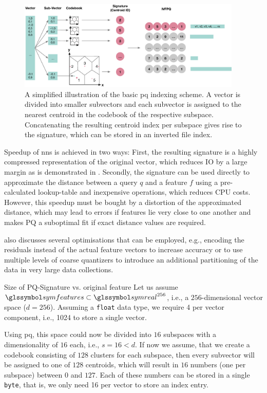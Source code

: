 \begin{figure}[tb]
    \centering
    \includegraphics[width=0.95\textwidth]{figures/pq}
    \caption{A simplified illustration of the basic \acrshort{pq} indexing scheme. A vector is divided into smaller subvectors and each subvector is assigned to the nearest centroid in the codebook of the respective subspace. Concatenating the resulting centroid index per subspace gives rise to the signature, which can be stored in an inverted file index.}
    \label{fig:pq}
\end{figure}

Speedup of \acrshort{nns} is achieved in two ways: First, the resulting signature is a highly compressed representation of the original vector, which reduces IO by a large margin as is demonstrated in . Secondly, the signature can be used directly to approximate the distance between a query $q$ and a feature $f$ using a pre-calculated lookup-table and inexpensive operations, which reduces CPU costs. However, this speedup must be bought by a distortion of the approximated distance, which may lead to errors if features lie very close to one another and makes PQ a suboptimal fit if exact distance values are required.

\cite{Jegou:2010Product} also discusses several optimisations that can be employed, e.g., encoding the residuals instead of the actual feature vectors to increase accuracy or to use multiple levels of coarse quantizers to introduce an additional partitioning of the data in very large data collections.

\begin{example}[label=example:pq_compression]{Size of PQ-Signature vs. original feature}{}
    Let us assume $\symfeatures \subset \symreal^{256}$, i.e., a $256$-dimensional vector space ($d = 256$). Assuming a \texttt{float} data type, we require \SI{4}{\byte} per vector component, i.e., \SI{1024}{\byte} to store a single vector.
    
    Using \acrshort{pq}, this space could now be divided into $16$ subspaces with a dimensionality of $16$ each, i.e., $s = 16 < d$. If now we assume, that we create a codebook consisting of $128$ clusters for each subspace, then every subvector will be assigned to one of $128$ centroids, which will result in $16$ numbers (one per subspace) between $0$ and $127$. Each of these numbers can be stored in a single \texttt{byte}, that is, we only need \SI{16}{\byte} per vector to store an index entry.
\end{example}

